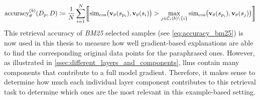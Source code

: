 \begin{equation}
\operatorname{accuracy}^{(b)}_{\theta}(D_{p},D)
\coloneqq
\frac{1}{N}\sum_{i=1}^{N}
\Iverson*{
  \simcos\bigl(\vXspi,\vXsi\bigr)
  >
  \max_{j\in\mathcal{C}_{i}(b)\setminus\{i\}}
  \simcos\bigl(\vXspi,\vXsj\bigr)
}
\label{eq:accuracy_bm25}
\end{equation}
This retrieval accuracy of \textit{BM25} selected samples (see \autoref{eq:accuracy_bm25}) is now used in this thesis to measure how well gradient-based explanations are able to find the corresponding original data points for the paraphrased ones. However, as illustrated in \autoref{ssec:different_layers_and_components}, \acrshort{llm}s contain many components that contribute to a full model gradient. Therefore, it makes sense to determine how much each individual layer component contributes to this retrieval task to determine which ones are the most relevant in this example-based setting.

